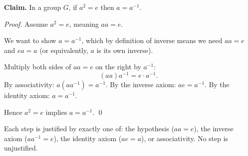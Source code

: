 \begin{example}
\textbf{Claim.} In a group $G$, if $a^2 = e$ then $a = a^{-1}$.

\medskip
\noindent\textit{Proof.}
Assume $a^2 = e$, meaning $aa = e$.

We want to show $a = a^{-1}$, which by definition of inverse means
we need $aa = e$ and $ea = a$ (or equivalently, $a$ is its own inverse).

Multiply both sides of $aa = e$ on the right by $a^{-1}$:
\[
(aa)a^{-1} = e \cdot a^{-1}.
\]
By associativity: $a(aa^{-1}) = a^{-1}$.
By the inverse axiom: $ae = a^{-1}$.
By the identity axiom: $a = a^{-1}$.

Hence $a^2 = e$ implies $a = a^{-1}$. \qed

\medskip
\noindent
Each step is justified by exactly one of: the hypothesis ($aa = e$),
the inverse axiom ($aa^{-1} = e$), the identity axiom ($ae = a$),
or associativity. No step is unjustified.
\end{example}
